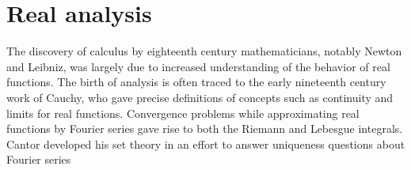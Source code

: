 \chapter{Real analysis}
The discovery of calculus by eighteenth century mathematicians, notably Newton
and Leibniz, was largely due to increased understanding of the behavior of real
functions. The birth of analysis is often traced to the early nineteenth century
work of Cauchy, who gave precise definitions of concepts such as continuity and
limits for real functions. Convergence problems while approximating real
functions by Fourier series gave rise to both the Riemann and Lebesgue
integrals. Cantor developed his set theory in an effort to answer uniqueness
questions about Fourier series
